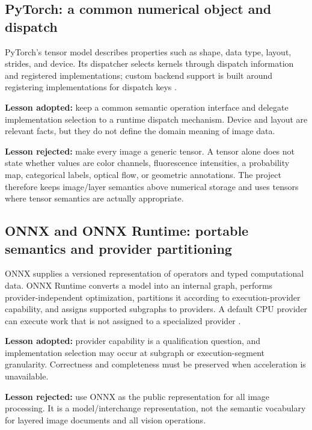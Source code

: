 \documentclass[11pt,a4paper,oneside]{article}
\begin{document}
\subsection{PyTorch: a common numerical object and dispatch}

PyTorch's tensor model describes properties such as shape, data type, layout, strides, and device. Its dispatcher selects kernels through dispatch information and registered implementations; custom backend support is built around registering implementations for dispatch keys \cite{pytorch-tensor,pytorch-dispatch,pytorch-custom-backend}.

\textbf{Lesson adopted:} keep a common semantic operation interface and delegate implementation selection to a runtime dispatch mechanism. Device and layout are relevant facts, but they do not define the domain meaning of image data.

\textbf{Lesson rejected:} make every image a generic tensor. A tensor alone does not state whether values are color channels, fluorescence intensities, a probability map, categorical labels, optical flow, or geometric annotations. The project therefore keeps image/layer semantics above numerical storage and uses tensors where tensor semantics are actually appropriate.

\subsection{ONNX and ONNX Runtime: portable semantics and provider partitioning}

ONNX supplies a versioned representation of operators and typed computational data. ONNX Runtime converts a model into an internal graph, performs provider-independent optimization, partitions it according to execution-provider capability, and assigns supported subgraphs to providers. A default CPU provider can execute work that is not assigned to a specialized provider \cite{onnx-ir,ort-architecture,ort-providers}.

\textbf{Lesson adopted:} provider capability is a qualification question, and implementation selection may occur at subgraph or execution-segment granularity. Correctness and completeness must be preserved when acceleration is unavailable.

\textbf{Lesson rejected:} use ONNX as the public representation for all image processing. It is a model/interchange representation, not the semantic vocabulary for layered image documents and all vision operations.
\end{document}
